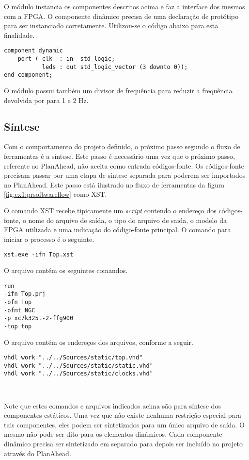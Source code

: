 \documentclass[11pt,a4paper,oneside]{book}
\begin{document}
O módulo  instancia os componentes descritos acima e faz a interface dos mesmos com a FPGA.
O componente dinâmico precisa de uma declaração de protótipo para ser instanciado corretamente.
Utilizou-se o código abaixo para esta finalidade.
\begin{lstlisting}[style=customVHDL]
component dynamic
    port ( clk  : in  std_logic;
           leds : out std_logic_vector (3 downto 0));
end component;
\end{lstlisting}
O módulo  possui também um divisor de frequência para reduzir a frequência devolvida por  para 1 e 2 Hz.

\subsection{Síntese}
Com o comportamento do projeto definido, o próximo passo segundo o fluxo de ferramentas é a síntese.
Este passo é necessário uma vez que o próximo passo, referente ao PlanAhead, não aceita como entrada códigos-fonte.
Os códigos-fonte precisam passar por uma etapa de síntese separada para poderem ser importados no PlanAhead.
Este passo está ilustrado no fluxo de ferramentas da figura \ref{fig:ex1:prsoftwareflow} como XST.

O comando XST recebe tipicamente um \textit{script} contendo o endereço dos códigos-fonte, o nome do arquivo de saída, o tipo do arquivo de saida, o modelo da FPGA utilizada e uma indicação do código-fonte principal.
O comando para iniciar o processo é o seguinte.
\begin{lstlisting}[style=customVHDL]
xst.exe -ifn Top.xst
\end{lstlisting}
O arquivo  contém os seguintes comandos.
\begin{lstlisting}[style=customVHDL]
run
-ifn Top.prj
-ofn Top
-ofmt NGC
-p xc7k325t-2-ffg900
-top top
\end{lstlisting}
O arquivo  contém os endereços dos arquivos, conforme a seguir.
\begin{lstlisting}[style=customVHDL]
vhdl work "../../Sources/static/top.vhd"
vhdl work "../../Sources/static/static.vhd"
vhdl work "../../Sources/static/clocks.vhd"
\end{lstlisting}\

Note que estes comandos e arquivos indicados acima são para síntese dos componentes estáticos.
Uma vez que não existe nenhuma restrição especial para tais componentes, eles podem ser síntetizados para um único arquivo de saída.
O mesmo não pode ser dito para os elementos dinâmicos.
Cada componente dinâmico precisa ser sintetizado em separado para depois ser incluído no projeto através do PlanAhead.
\end{document}

